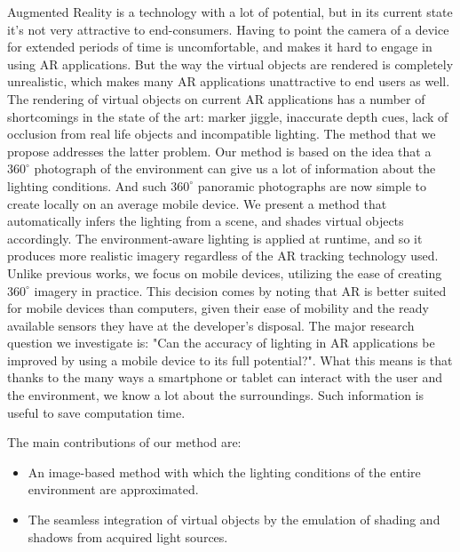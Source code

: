 Augmented Reality is a technology with a lot of potential, but in its current state it's not very attractive to end-consumers. Having to point the camera of a device for extended periods of time is uncomfortable, and makes it hard to engage in using AR applications. But the way the virtual objects are rendered is completely unrealistic, which makes many AR applications unattractive to end users as well.\newline
The rendering of virtual objects on current AR applications has a number of shortcomings in the state of the art: marker jiggle, inaccurate depth cues, lack of occlusion from real life objects and incompatible lighting.\newline
The method that we propose addresses the latter problem. Our method is based on the idea that a $360^{\circ}$  photograph of the environment can give us a lot of information about the lighting conditions. And such $360^{\circ}$  panoramic photographs are now simple to create locally on an average mobile device. \newline
We present a method that automatically infers the lighting from a scene, and shades virtual objects accordingly. The environment-aware lighting is applied at runtime, and so it produces more realistic imagery regardless of the AR tracking technology used.\newline
 Unlike previous works, we focus on mobile devices, utilizing the ease of creating $360^{\circ}$ imagery in practice. This decision comes by noting that AR is better suited for mobile devices than computers, given their ease of mobility and the ready available sensors they have at the developer's disposal.\newline
The major research question we investigate is: "Can the accuracy of lighting in AR applications be improved by using a mobile device to its full potential?". What this means is that thanks to the many ways a smartphone or tablet can interact with the user and the environment, we know a lot about the surroundings. Such information is useful to save computation time.\newline

The main contributions of our method are:\newline
\begin{itemize}
    \item An image-based method with which the lighting conditions of the entire environment are approximated.
    \item The seamless integration of virtual objects by the emulation of shading and shadows from acquired light sources.
\end{itemize}